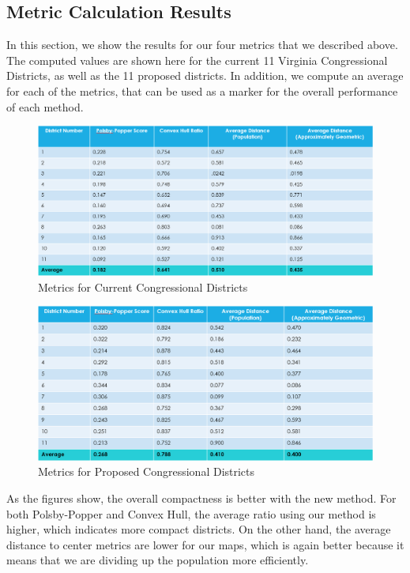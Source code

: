 \documentclass[11pt]{article}
\begin{document}
\subsection{Metric Calculation Results}

In this section, we show the results for our four metrics that we described above. The computed values are shown here for the current 11 Virginia Congressional Districts, as well as the 11 proposed districts. In addition, we compute an average for each of the metrics, that can be used as a marker for the overall performance of each method.

\begin{figure}[H]
	\centering
	\includegraphics[width=\textwidth]{MetricsCurrent}
	\caption{Metrics for Current Congressional Districts}
	\label{fig:mc}
\end{figure}

\begin{figure}[H]
	\centering
	\includegraphics[width=\textwidth]{MetricsNew}
	\caption{Metrics for Proposed Congressional Districts}
	\label{fig:mn}
\end{figure}

As the figures show, the overall compactness is better with the new method. For both Polsby-Popper and Convex Hull, the average ratio using our method is higher, which indicates more compact districts. On the other hand, the average distance to center metrics are lower for our maps, which is again better because it means that we are dividing up the population more efficiently.
\end{document}
